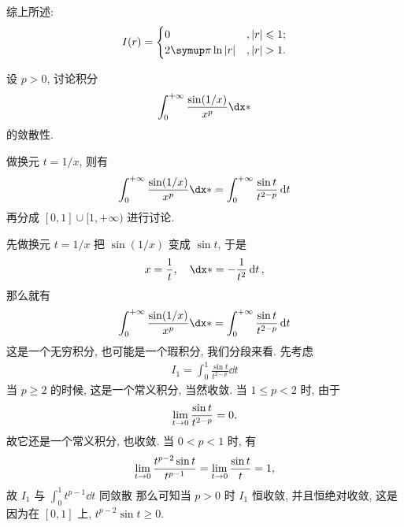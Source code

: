 \begin{exercise}[series=exer]
\begin{answer}
    综上所述:
    \begin{align*}
        I(r) = \begin{cases}
            0 & , \abs{r} \le 1;\\
            2\pi \ln \abs{r} & , \abs{r} > 1.
        \end{cases}
    \end{align*}
  \end{answer}
  \item 设 $ p > 0 $, 讨论积分
  \begin{align*}
      \int_{0}^{+\infty} \frac{\sin(1/x)}{x^{p}} \dx*
  \end{align*}
  的敛散性.
  \begin{hint}
      做换元 $ t = 1/x $, 则有
      \begin{align*}
          \int_{0}^{+\infty} \frac{\sin(1/x)}{x^{p}} \dx* = \int_{0}^{+\infty} \frac{\sin t}{t^{2 - p}} \dd{t}
      \end{align*}
      再分成 $ [0, 1]\cup[1, +\infty) $ 进行讨论.
  \end{hint}
  \begin{answer}
    先做换元 $ t = 1/x $ 把 $ \sin(1/x) $ 变成 $ \sin t $, 于是
    \begin{align*}
        x =\frac{1}{t}, \quad \dx* = - \frac{1}{t^{2}} \dd{t},
    \end{align*}
    那么就有
    \begin{align*}
        \int_{0}^{+\infty} \frac{\sin(1/x)}{x^{p}} \dx* = \int_{0}^{+\infty} \frac{\sin t}{t^{2 - p}} \dd{t}
    \end{align*}
    这是一个无穷积分, 也可能是一个瑕积分, 我们分段来看. 
    先考虑
    \begin{align*}
        I_{1} = \int_{0}^{1} \frac{\sin t}{t^{2 - p}} \dd{t}
    \end{align*}
    当 $ p \ge 2 $ 的时候, 这是一个常义积分, 当然收敛. 当 $ 1 \le p < 2 $ 时, 由于
    \begin{align*}
        \lim_{t \to 0}\frac{\sin t}{t^{2 - p}} = 0,
    \end{align*}
    故它还是一个常义积分, 也收敛. 当 $ 0 < p < 1 $ 时, 有
    \begin{align*}
        \lim_{t \to 0} \frac{t^{p - 2} \sin t }{t^{p - 1}} = \lim_{t \to 0} \frac{\sin t}{t} = 1,
    \end{align*}
    故 $ I_{1} $ 与 $ \int_{0}^{1} t^{p - 1} \dd{t} $ 同敛散 那么可知当 $ p > 0 $ 时 $ I_{1} $ 恒收敛, 并且恒绝对收敛,
    这是因为在 $ [0, 1] $ 上, $ t^{p - 2} \sin t \ge 0 $.


\end{answer}
\end{exercise}
